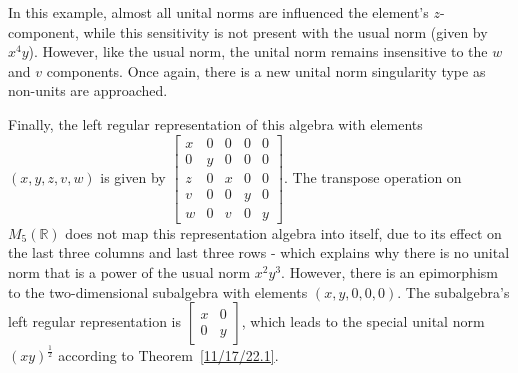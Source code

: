 \documentclass{amsart}
\theoremstyle{definition}
\numberwithin{theorem}{section}
\numberwithin{equation}{section}
\begin{document}
In this example, almost all unital norms are influenced the element's $z$-component, while this sensitivity is not present with the usual norm (given by $x^4y$).  However, like the usual norm,  the unital norm remains insensitive to the $w$ and $v$ components.  Once again, there is a new unital norm singularity type as non-units are approached.  

Finally, the left regular representation of this algebra with elements $(x,y,z,v,w)$ is given by $ \left[
\begin{array}{ccccc}
x & 0 & 0 & 0 & 0   \\
0 & y & 0 & 0 & 0 \\
z & 0 &  x & 0 & 0  \\
v & 0 &  0 & y & 0  \\
w & 0 &  v & 0 & y
\end{array}
\right].$ 
The transpose operation on $M_5(\mathbb{R})$ does not map this representation algebra into itself, due to its effect on the last three columns and last three rows - which explains why there is no unital norm that is a power of the usual norm $x^2y^3$.  However, there is an epimorphism to the two-dimensional subalgebra with elements $(x,y,0,0,0)$.  The subalgebra's left regular representation is $\left[\begin{array}{ccc}
x & 0  \\
 0 & y  
\end{array} \right]$, which leads to the special unital norm $(xy)^\frac{1}{2}$ according to \mbox{Theorem \ref{11/17/22.1}}.
\end{document}
